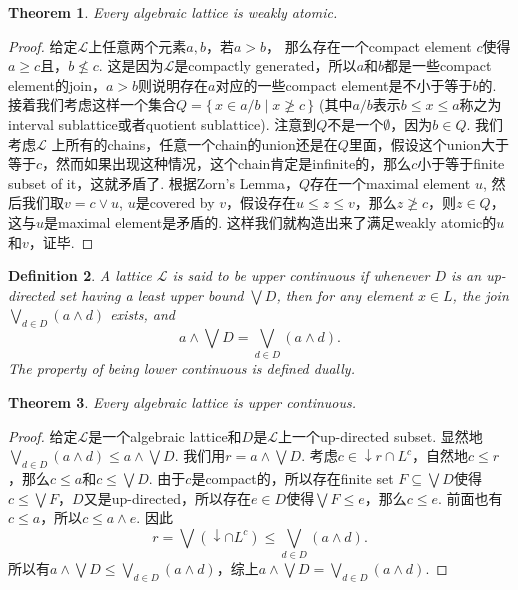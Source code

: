 \documentclass{article}
\newtheorem{theorem}{Theorem}[section]
\newtheorem{definition}[theorem]{Definition}
\newcommand\Set[2]{\{\,#1\mid#2\,\}} %
\newcommand\lattice{\mathcal{L}}
\begin{document}
\begin{theorem}
\rm Every algebraic lattice is weakly atomic.
\end{theorem}

\begin{proof}
给定$\lattice$上任意两个元素$a,b$，若$a > b$， 那么存在一个compact element $c$使得$a \geq c$且，$b \nleq c$. 这是因为$\lattice$是compactly generated，所以$a$和$b$都是一些compact element的join，$a>b$则说明存在$a$对应的一些compact element是不小于等于$b$的. 接着我们考虑这样一个集合$Q=\Set{x \in a/b}{x \ngeq c}$ (其中$a/b$表示$b \leq x \leq a$称之为interval sublattice或者quotient sublattice). 注意到$Q$不是一个$\emptyset$，因为$b \in Q$. 我们考虑$\lattice$ 上所有的chains，任意一个chain的union还是在$Q$里面，假设这个union大于等于$c$，然而如果出现这种情况，这个chain肯定是infinite的，那么$c$小于等于finite subset of it，这就矛盾了. 根据Zorn's Lemma，$Q$存在一个maximal element $u$, 然后我们取$v = c \vee u$, $u$是covered by $v$，假设存在$u \leq z \leq v$，那么$z \ngeq c$，则$z \in Q$，这与$u$是maximal element是矛盾的. 这样我们就构造出来了满足weakly atomic的$u$和$v$，证毕. 
\end{proof}

\begin{definition}
\rm A lattice $\lattice$ is said to be {\color{red} upper continuous} if whenever $D$ is an up-directed set having a least upper bound $\bigvee D$, then for any element $x \in L$, the join $\bigvee_{d \in D}(a \wedge d)$ exists, and 
$$
a \wedge \bigvee D = \bigvee_{d \in D}(a \wedge d).
$$
The property of being lower continuous is defined dually.
\end{definition}

\begin{theorem}
\rm Every algebraic lattice is upper continuous.
\end{theorem}

\begin{proof}
给定$\lattice$是一个algebraic lattice和$D$是$\lattice$上一个up-directed subset. 显然地$\bigvee_{d \in D}(a \wedge d) \leq a \wedge \bigvee D$. 我们用$r = a \wedge \bigvee D$. 考虑$c \in \downarrow r \cap L^c$，自然地$c \leq r$，那么$c \leq a$和$c \leq \bigvee D$. 由于$c$是compact的，所以存在finite set $F \subseteq \bigvee D$使得$c \leq \bigvee F$，$D$又是up-directed，所以存在$e \in D$使得$\bigvee F \leq e$，那么$c \leq e$. 前面也有$c \leq a$，所以$c \leq a \wedge e$. 因此
$$
r = \bigvee (\downarrow \cap L^c) \leq \bigvee_{d \in D}(a \wedge d).
$$
所以有$a \wedge \bigvee D \leq \bigvee_{d \in D}(a \wedge d)$，综上$a \wedge \bigvee D = \bigvee_{d \in D}(a \wedge d)$. 
\end{proof}
\end{document}
